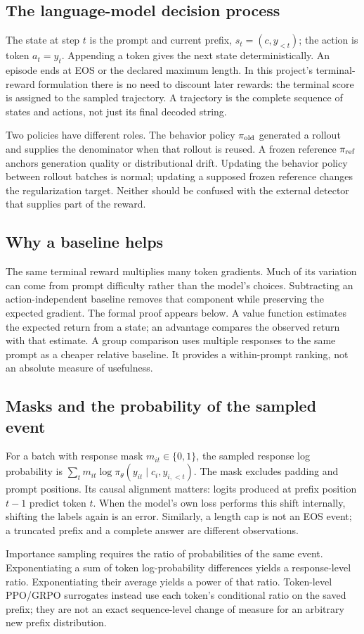 \subsection{The language-model decision process}
The state at step $t$ is the prompt and current prefix, $s_t=(c,y_{<t})$; the action is token $a_t=y_t$. Appending a token gives the next state deterministically. An episode ends at EOS or the declared maximum length. In this project's terminal-reward formulation there is no need to discount later rewards: the terminal score is assigned to the sampled trajectory. A trajectory is the complete sequence of states and actions, not just its final decoded string.

Two policies have different roles. The behavior policy $\pi_{\rm old}$ generated a rollout and supplies the denominator when that rollout is reused. A frozen reference $\pi_{\rm ref}$ anchors generation quality or distributional drift. Updating the behavior policy between rollout batches is normal; updating a supposed frozen reference changes the regularization target. Neither should be confused with the external detector that supplies part of the reward.

\subsection{Why a baseline helps}
The same terminal reward multiplies many token gradients. Much of its variation can come from prompt difficulty rather than the model's choices. Subtracting an action-independent baseline removes that component while preserving the expected gradient. The formal proof appears below. A value function estimates the expected return from a state; an advantage compares the observed return with that estimate. A group comparison uses multiple responses to the same prompt as a cheaper relative baseline. It provides a within-prompt ranking, not an absolute measure of usefulness.

\subsection{Masks and the probability of the sampled event}
For a batch with response mask $m_{it}\in\{0,1\}$, the sampled response log probability is $\sum_t m_{it}\log\pi_\theta(y_{it}\mid c_i,y_{i,<t})$. The mask excludes padding and prompt positions. Its causal alignment matters: logits produced at prefix position $t-1$ predict token $t$. When the model's own loss performs this shift internally, shifting the labels again is an error. Similarly, a length cap is not an EOS event; a truncated prefix and a complete answer are different observations.

Importance sampling requires the ratio of probabilities of the same event. Exponentiating a sum of token log-probability differences yields a response-level ratio. Exponentiating their average yields a power of that ratio. Token-level PPO/GRPO surrogates instead use each token's conditional ratio on the saved prefix; they are not an exact sequence-level change of measure for an arbitrary new prefix distribution.

